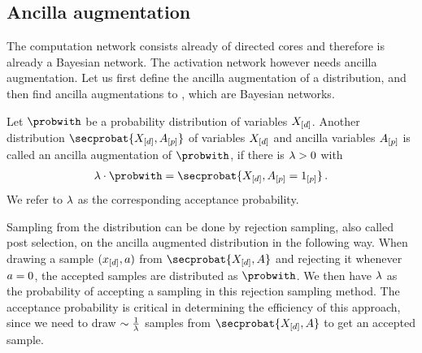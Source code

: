 %        

%

\subsection{Ancilla augmentation}

The computation network consists already of directed cores and therefore is already a Bayesian network.
The activation network however needs ancilla augmentation.
Let us first define the ancilla augmentation of a distribution, and then find ancilla augmentations to \CompActNets{}, which are Bayesian networks.

\begin{definition}
    Let $\probwith$ be a probability distribution of variables $X_{[d]}$.
    Another distribution $\secprobat{\shortcatvariables,\avariables}$ of variables $X_{[d]}$ and ancilla variables $A_{[p]}$ is called an ancilla augmentation of $\probwith$, if there is $\lambda>0$ with
    \begin{align*}
        \acceptanceprob \cdot \probwith
        = \secprobat{\shortcatvariables,\avariables=1_{[\seldim]}} \, .
    \end{align*}
    We refer to $\lambda$ as the corresponding acceptance probability.
\end{definition}

Sampling from the distribution can be done by rejection sampling, also called post selection, on the ancilla augmented distribution in the following way.
When drawing a sample $(x_{[d]},a)$ from $\secprobat{\shortcatvariables,\avariable}$ and rejecting it whenever $a=0$, the accepted samples are distributed as $\probwith$.
We then have $\lambda$ as the probability of accepting a sampling in this rejection sampling method.
The acceptance probability is critical in determining the efficiency of this approach, since we need to draw $\sim\frac{1}{\lambda}$ samples from $\secprobat{\shortcatvariables,\avariable}$ to get an accepted sample.

